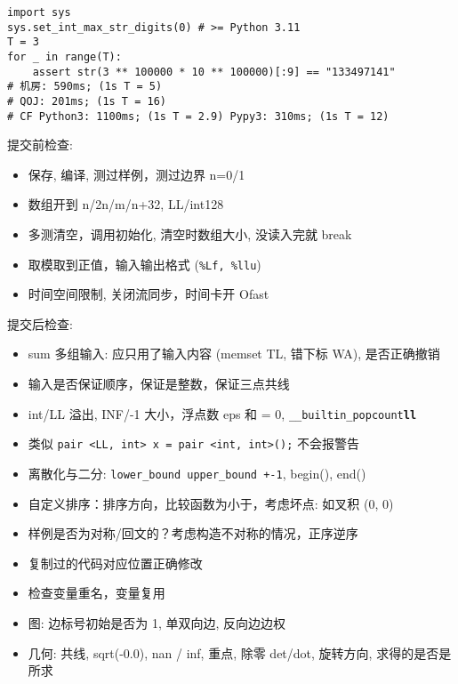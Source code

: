 \begin{small}
\begin{itemize}[leftmargin=1mm]
\begin{verbatim}
\end{verbatim}
\begin{verbatim}
import sys
sys.set_int_max_str_digits(0) # >= Python 3.11 
T = 3
for _ in range(T):
    assert str(3 ** 100000 * 10 ** 100000)[:9] == "133497141"
# 机房: 590ms; (1s T = 5)
# QOJ: 201ms; (1s T = 16)
# CF Python3: 1100ms; (1s T = 2.9) Pypy3: 310ms; (1s T = 12)
\end{verbatim}
\end{itemize}
提交前检查: 
\begin{itemize}[leftmargin=1mm]
    \setlength{\itemsep}{0pt}
    \setlength{\parskip}{0.5pt}
\item 保存, 编译, 测过样例，测过边界 n=0/1
\item 数组开到 n/2n/m/n+32, LL/int128
\item 多测清空，调用初始化, 清空时数组大小, 没读入完就 break 
\item 取模取到正值，输入输出格式 (\texttt{\%Lf, \%llu})
\item 时间空间限制, 关闭流同步，时间卡开 Ofast
\end{itemize}
提交后检查:
\begin{itemize}[leftmargin=1mm]
\setlength{\itemsep}{0pt}
\setlength{\parskip}{0.5pt}
\item sum 多组输入: 应只用了输入内容 (memset TL, 错下标 WA), 是否正确撤销
\item 输入是否保证顺序，保证是整数，保证三点共线
\item int/LL 溢出, INF/-1 大小，浮点数 eps 和 = 0, \texttt{\_\_builtin\_popcount\textbf{ll}}
\item 类似 \texttt{pair <LL, int> x = pair <int, int>();} 不会报警告 
\item 离散化与二分: \texttt{lower\_bound upper\_bound +-1}, begin(), end()
\item 自定义排序：排序方向，比较函数为小于，考虑坏点: 如叉积 (0, 0)
\item 样例是否为对称/回文的？考虑构造不对称的情况，正序逆序
\item 复制过的代码对应位置正确修改
\item 检查变量重名，变量复用
\item 图: 边标号初始是否为 1, 单双向边, 反向边边权
\item 几何: 共线, sqrt(-0.0), nan / inf, 重点, 除零 det/dot, 旋转方向, 求得的是否是所求
\end{itemize}
\end{small}